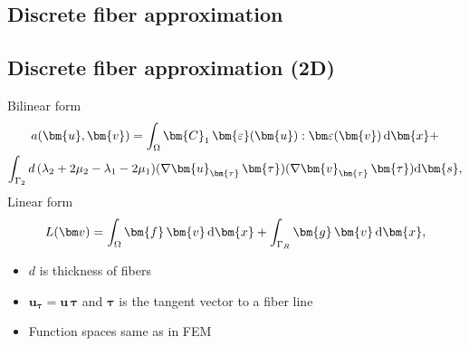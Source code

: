 \documentclass[compress,pdf,mathserif]{beamer}
\begin{document}
\subsection{Discrete fiber approximation}
\begin{frame}
    \centering

\end{frame}

\subsection{Discrete fiber approximation (2D)}
\begin{frame}
    \centering
    Bilinear form
    \[
        \begin{gathered}
a(\bm{u}, \bm{v}) = \int_\Omega \bm{C}_1\, \bm{\varepsilon}(\bm{u}) : \bm\varepsilon(\bm{v})\, {\rm d}\bm{x}+\\
\int_{\Gamma_{2}} d\, (\lambda_2 + 2\mu_2 - \lambda_1 - 2\mu_1) (\nabla \bm{u}_{\bm{\tau}}\, {\bm{\tau}})(\nabla \bm{v}_{\bm{\tau}}\, {\bm{\tau}}) {\rm d}\bm{s},
        \end{gathered}
\]
Linear form
\[
L(\bm v) = \int_{\Omega}\bm{f}\, \bm{v}\, {\rm d}\bm{x} +\int_{\Gamma_R}\bm{g}\, \bm{v}\, {\rm{d}}\bm{x},
\]

\begin{itemize}
    \item $d$ is thickness of fibers
    \item $\bm{u}_{\bm{\tau}} = \bm{u}\, \bm{\tau}$ and $\bm{\tau}$ is the tangent vector to a fiber line
    \item Function spaces same as in FEM
\end{itemize}
\end{frame}
\end{document}
